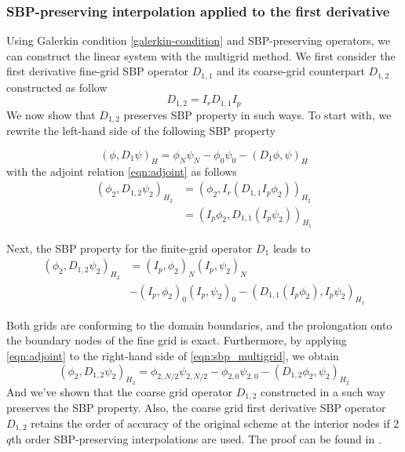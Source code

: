 \subsubsection{SBP-preserving interpolation applied to the first derivative}
Using Galerkin condition \autoref{galerkin-condition} and SBP-preserving operators, we can construct the linear system with the multigrid method. We first consider the first derivative fine-grid SBP operator $D_{1,1}$ and its coarse-grid counterpart $D_{1,2}$ constructed as follow
\begin{equation}
    D_{1,2} = I_r D_{1,1} I_p
\end{equation}
We now show that $D_{1,2}$ preserves SBP property in such ways. To start with, we rewrite the left-hand side of the following SBP property

\begin{equation}
    (\phi,D_1\psi)_H = \phi_N\psi_N - \phi_0\psi_0 - (D_1\phi,\psi)_H
\end{equation}
with the adjoint relation \autoref{eqn:adjoint} as follows
\begin{align}
    (\phi_2,D_{1,2}\psi_2)_{H_2} &= (\phi_2,I_r(D_{1,1}I_p\phi_2))_{H_2} \nonumber\\&= (I_p\phi_2,D_{1,1}(I_p\psi_2))_{H_1}
\end{align}

Next, the SBP property for the finite-grid operator $D_1$ leads to
\begin{align}
     (\phi_2,D_{1,2}\psi_2)_{H_2} &= (I_p,\phi_2)_N(I_p,\psi_2)_N \nonumber \\ &- (I_p,\phi_2)_0(I_p,\psi_2)_0 - (D_{1,1}(I_p\phi_2),I_p\psi_2)_{H_1}
     \label{eqn:sbp_multigrid}
\end{align}

Both grids are conforming to the domain boundaries, and the prolongation onto the boundary nodes of the fine grid is exact. Furthermore, by applying \autoref{eqn:adjoint} to the right-hand side of \autoref{eqn:sbp_multigrid}, we obtain 
\begin{equation}
    (\phi_2,D_{1,2}\psi_2)_{H_2} = \phi_{2,N/2}\psi_{2,N/2} - \phi_{2,0}\psi_{2,0} - (D_{1,2}\phi_{2},\psi_{2})_{H_2}
\end{equation}
And we've shown that the coarse grid operator $D_{1,2}$ constructed in a such way preserves the SBP property. Also, the coarse grid first derivative SBP operator $D_{1,2}$ retains the order of accuracy of the original scheme at the interior nodes if 2$q$th order SBP-preserving interpolations are used. The proof can be found in \cite{ruggiu2018new}.

